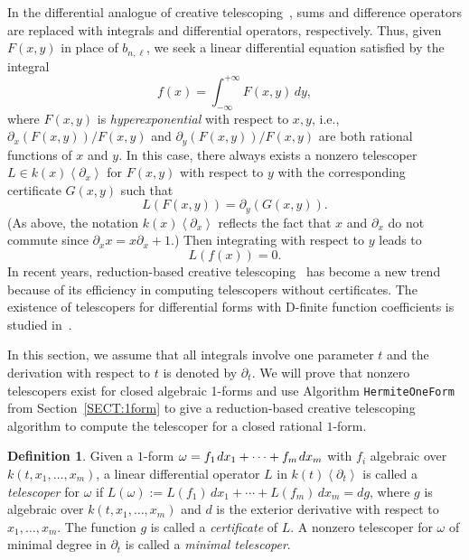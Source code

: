 \documentclass{amsart}
\theoremstyle{definition}
\newtheorem{defin}[thm]{Definition}
\numberwithin{equation}{section}
\numberwithin{thm}{section}
\begin{document}
In the differential analogue of creative telescoping~\cite{AlmkvistZeilberger1990},
sums and difference operators are replaced with integrals and differential operators, respectively.  Thus, given $F(x,y)$ in place of $b_{n,\ell}$, we seek
 a linear differential equation satisfied by the integral
\[f(x)= \int_{-\infty}^{+\infty} F(x,y) \, dy ,\]
where $F(x,y)$ is \textit{hyperexponential} with respect to $x,y$, i.e., $\partial_x(F(x,y))/F(x,y)$ and $\partial_y(F(x,y))/F(x,y)$ are both rational functions of $x$ and $y$.  In this case, there always exists a nonzero telescoper $L\in k(x)\left\langle \partial_x\right\rangle$ for $F(x,y)$ with respect to $y$ with the corresponding certificate $G(x,y)$ such that
\[L(F(x,y))= \partial_y (G(x,y)).\]
(As above, the notation $k(x)\left\langle \partial_x\right\rangle$ reflects the fact that $x$ and $\partial_x$ do not commute since $\partial_x x = x\partial_x + 1$.) Then integrating with respect to $y$ leads to
\[L(f(x))=0.\]
In recent years, reduction-based creative telescoping~\cite{BostanChenChyzakLi, bostan-chen-chyzak-li-xin, BostanPierreBruno2013, ChenHuangKauersLi, ChenKauersKoutschan2016,bostan-chyzak-lairez-salvy, chen-vanhoeij-kauers-koutschan} has become a new trend because of its efficiency in computing telescopers without certificates. The existence of telescopers for differential forms with D-finite function coefficients is studied in~\cite{ChenFengLiSingerWatt2024}.

In this section, we assume that all integrals involve one parameter $t$ and the derivation with respect to $t$ is denoted by $\partial_t$. We will prove that nonzero telescopers exist for closed algebraic 1-forms and use Algorithm \texttt{HermiteOneForm} from Section~\ref{SECT:1form} to give a reduction-based creative telescoping algorithm to compute the telescoper for a closed rational $1$-form.

\begin{defin}
	Given a $1$-form $\omega = f_1 \hskip1pt dx_1+ \cdots + f_m \hskip1pt dx_m$ with $f_i$ algebraic over $k(t,x_1,\ldots,x_m)$, a linear differential operator $L$ in $k(t)\left<\partial_t\right>$ is called a \textit{telescoper} for $\omega$ if $L(\omega) := L(f_1) \, dx_1 + \cdots + L(f_m)\, dx_m =  dg$, where $g$ is algebraic  over $k(t,x_1,\ldots,x_m)$ and $d$ is the exterior derivative with respect to $x_1,\dots,x_m$. The function $g$ is called a \textit{certificate} of $L$.  A nonzero telescoper for $\omega$ of minimal degree in $\partial_t$ is called a \textit{minimal telescoper}.
\end{defin}
\end{document}
